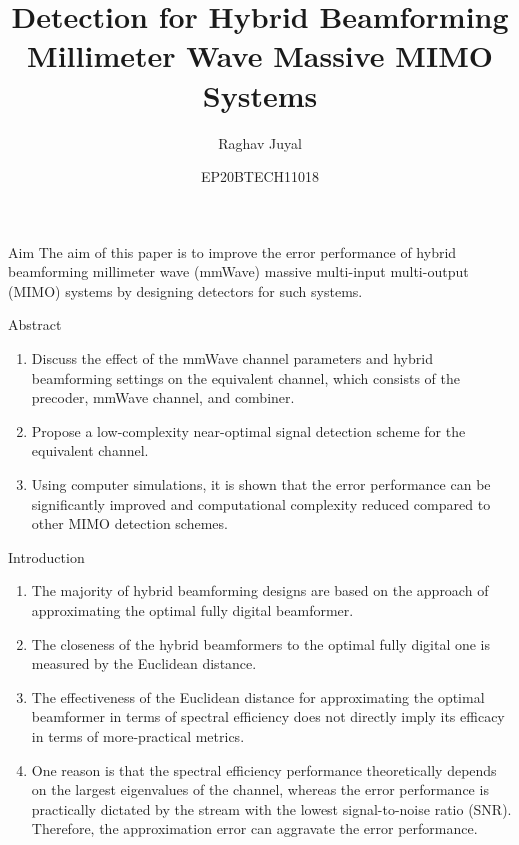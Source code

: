 \documentclass{beamer}
\title{Detection for Hybrid Beamforming Millimeter Wave Massive MIMO Systems}
\author{Raghav Juyal}
\date{EP20BTECH11018}
\begin{document}
\begin{frame}
\titlepage
\end{frame}
\begin{frame}{Aim}
    The aim of this paper is to improve the error performance
    of hybrid beamforming millimeter wave (mmWave) massive
    multi-input multi-output (MIMO) systems by designing detectors
    for such systems. 
\end{frame}

\begin{frame}{Abstract}
\begin{enumerate}
    \item Discuss the effect of the mmWave
channel parameters and hybrid beamforming settings on the
equivalent channel, which consists of the precoder, mmWave
channel, and combiner.
    \item Propose a low-complexity near-optimal signal detection scheme for the equivalent channel.
    \item Using computer simulations, it is shown that the error performance can be significantly improved and computational complexity reduced compared to other MIMO detection schemes.
\end{enumerate}

\end{frame}

\begin{frame}{Introduction}
\begin{enumerate}
    \item The majority of hybrid beamforming designs are based on the approach of approximating the optimal fully digital beamformer.
    
    \item The closeness of the hybrid beamformers to the optimal fully digital one is measured by the Euclidean distance.
    
    \item The effectiveness of the Euclidean distance for approximating the optimal beamformer in terms of spectral efficiency does not directly imply its efficacy in terms of more-practical metrics. 
    \item One reason is that the spectral efficiency performance theoretically depends on the largest eigenvalues of the channel, whereas the error performance is practically dictated by the stream with the lowest signal-to-noise ratio (SNR). Therefore, the approximation error can aggravate the error performance.
\end{enumerate}
\end{frame}
\end{document}
